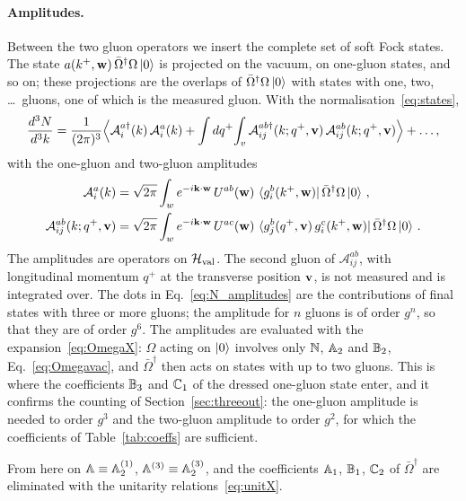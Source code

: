 \paragraph{Amplitudes.} Between the two gluon operators we insert the complete set of soft Fock states. The state $a(k^+,\mathbf{w})\,\bar\Omega^\dagger\Omega\ket0$ is projected on the vacuum, on one-gluon states, and so on; these projections are the overlaps of $\bar\Omega^\dagger\Omega\ket0$ with states with one, two, \dots\ gluons, one of which is the measured gluon. With the normalisation~\eqref{eq:states},
\begin{align}\label{eq:N_amplitudes}
\frac{d^3N}{d^3k}=\frac{1}{(2\pi)^3}\Big\langle\mathcal A^{a\dagger}_i(k)\,\mathcal A^a_i(k)+\int dq^+\!\int_{v}\mathcal A^{ab\dagger}_{ij}(k;q^+,\mathbf{v})\,\mathcal A^{ab}_{ij}(k;q^+,\mathbf{v})\Big\rangle+\dots,
\end{align}
with the one-gluon and two-gluon amplitudes
\begin{align}\label{eq:amplitudes_def}
\mathcal A^a_i(k)&=\sqrt{2\pi}\int_{w}e^{-i\mathbf{k}\cdot\mathbf{w}}\,U^{ab}(\mathbf{w})\,\bra{g^b_i(k^+,\mathbf{w})}\bar\Omega^\dagger\Omega\ket0\,,\notag\\
\mathcal A^{ab}_{ij}(k;q^+,\mathbf{v})&=\sqrt{2\pi}\int_{w}e^{-i\mathbf{k}\cdot\mathbf{w}}\,U^{ac}(\mathbf{w})\,\bra{g^b_j(q^+,\mathbf{v})\,g^c_i(k^+,\mathbf{w})}\bar\Omega^\dagger\Omega\ket0\,.
\end{align}
The amplitudes are operators on $\mathcal H_{\rm val}$. The second gluon of $\mathcal A^{ab}_{ij}$, with longitudinal momentum $q^+$ at the transverse position $\mathbf{v}$, is not measured and is integrated over. The dots in Eq.~\eqref{eq:N_amplitudes} are the contributions of final states with three or more gluons; the amplitude for $n$ gluons is of order $g^n$, so that they are of order $g^6$. The amplitudes are evaluated with the expansion~\eqref{eq:OmegaX}: $\Omega$ acting on $\ket0$ involves only $\mathbb{N}$, $\mathbb{A}_2$ and $\mathbb{B}_2$, Eq.~\eqref{eq:Omegavac}, and $\bar\Omega^\dagger$ then acts on states with up to two gluons. This is where the coefficients $\mathbb{B}_3$ and $\mathbb{C}_1$ of the dressed one-gluon state enter, and it confirms the counting of Section~\ref{sec:threeout}: the one-gluon amplitude is needed to order $g^3$ and the two-gluon amplitude to order $g^2$, for which the coefficients of Table~\ref{tab:coeffs} are sufficient.

From here on $\mathbb{A}\equiv\mathbb{A}^{(1)}_2$, $\mathbb{A}^{(3)}\equiv\mathbb{A}^{(3)}_2$, and the coefficients $\mathbb{A}_1$, $\mathbb{B}_1$, $\mathbb{C}_2$ of $\bar\Omega^\dagger$ are eliminated with the unitarity relations~\eqref{eq:unitX}.

